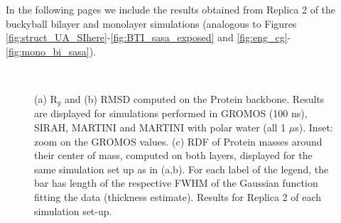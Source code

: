 In the following pages we include the results obtained from Replica 2 of the buckyball bilayer and monolayer simulations (analogous to Figures \ref{fig:struct_UA_SIhere}-\ref{fig:BTI_sasa_exposed} and \ref{fig:eng_cg}-\ref{fig:mono_bi_sasa}).

\begin{figure}[p]
\centering
{} 
 \\
\caption[(SI) Replica 2: Structural measures on buckyball in solution]{(a) R$_g$ and (b) RMSD computed on the Protein backbone. Results are displayed for simulations performed in GROMOS (100 ns), SIRAH, MARTINI and MARTINI with polar water (all 1 $\mu$s). Inset: zoom on the GROMOS values. (c) RDF of Protein masses around their center of mass, computed on both layers, displayed for the same simulation set up as in (a,b). For each label of the legend, the bar has length of the respective FWHM of the Gaussian function fitting the data (thickness estimate). Results for Replica 2 of each simulation set-up.}
\label{fig:struct_UA_SIhere2}
\end{figure}


